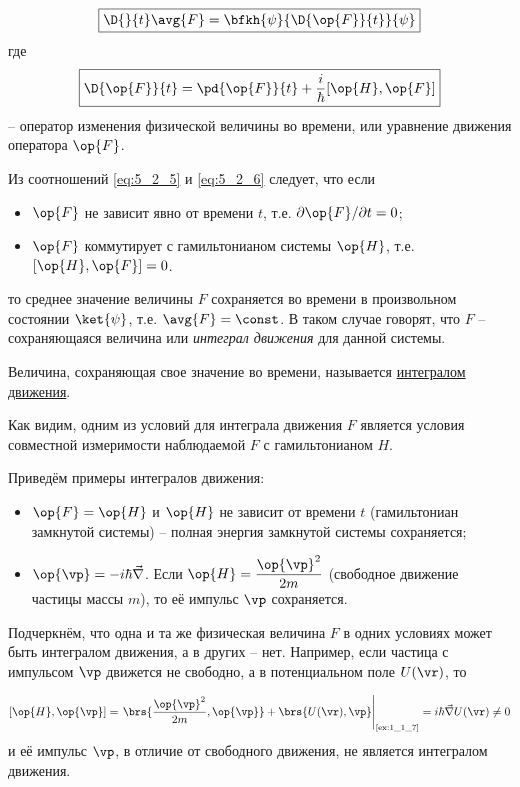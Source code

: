 \begin{equation}
\label{eq:5_2_5}
  \boxed{
    \D{}{t} \avg{F} = \bfkh{\psi}{\D{\op{F}}{t}}{\psi}
  }
\end{equation}%
%
где
\begin{equation}
\label{eq:5_2_6}
\boxed{\D{\op{F}}{t} = \pd{\op{F}}{t} + \frac{i}{\hbar} [\op{H}, \op{F}]}
\end{equation}
-- оператор изменения физической величины во времени, или уравнение движения оператора $\op{F}$.

Из соотношений \eqref{eq:5_2_5} и \eqref{eq:5_2_6} следует, что если
\begin{itemize}
\item $\op{F}$ не зависит явно от времени $t$, т.е. $\partial\op{F}/\partial{t} = 0$;
\item $\op{F}$ коммутирует с гамильтонианом системы $\op{H}$, т.е. $[\op{H}, \op{F}]=0$.
\end{itemize}%
%
то среднее значение величины $F$ сохраняется во времени в произвольном состоянии $\ket{\psi}$, т.е. $\avg{F} = \const$. В таком случае говорят, что $F$ -- сохраняющаяся величина или {\em интеграл движения} для данной системы.

\begin{defn}
Величина, сохраняющая свое значение во времени, называется \underline{интегралом движения}.
\end{defn}%
%
Как видим, одним из условий для интеграла движения $F$ является условия совместной измеримости наблюдаемой $F$ с гамильтонианом $H$.

Приведём примеры интегралов движения:

\begin{itemize}
\item $\op{F} = \op{H}$ и $\op{H}$ не зависит от времени $t$ (гамильтониан замкнутой системы) -- полная энергия замкнутой системы сохраняется;
\item $\op{\vp} = - i \hbar \vec{\nabla}$.  Если $\displaystyle\op{H} = \frac{\op{\vp}^2}{2m}$ (свободное движение частицы массы $m$), то её импульс $\vp$ сохраняется.
\end{itemize}%
%
Подчеркнём, что одна и та же физическая величина $F$ в одних условиях может быть интегралом движения, а в других -- нет. Например, если частица с импульсом $\vp$ движется не свободно, а в потенциальном поле $U(\vr)$, то

\begin{equation}
\label{eq:5_2_7}
  [\op{H}, \op{\vp}] =
  \left.
    \brs{\frac{\op{\vp}^2}{2m}, \op{\vp}} + \brs{U(\vr), \vp}
  \right|_{\text{\cref{ex:1_1_7}}} =
  i \hbar \vec{\nabla} U(\vr) \ne 0
\end{equation}%
%
и её импульс $\vp$, в отличие от свободного движения, не является интегралом движения.

